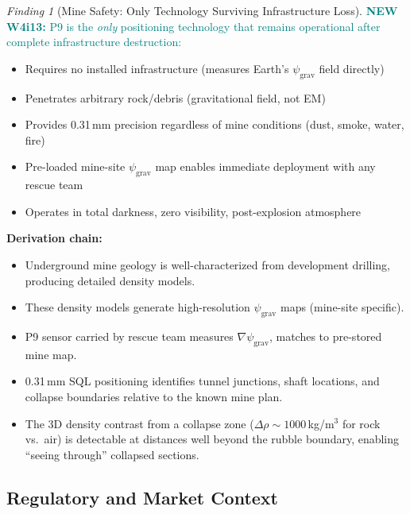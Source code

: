 \documentclass[11pt]{article}
\theoremstyle{definition}
\theoremstyle{remark}
\newtheorem{finding}[theorem]{Finding}
\newcommand{\psigrav}{\psi_{\mathrm{grav}}}
\newcommand{\drho}{\Delta\rho}
\newcommand{\newfinding}[1]{\textcolor{teal}{\textbf{NEW W4i13:} #1}}
\begin{document}
\begin{finding}[Mine Safety: Only Technology Surviving Infrastructure Loss]
\label{find:mine-safety}
\newfinding{P9 is the \emph{only} positioning technology that remains
operational after complete infrastructure destruction:}
\begin{itemize}[nosep]
\item Requires no installed infrastructure (measures Earth's $\psigrav$
  field directly)
\item Penetrates arbitrary rock/debris (gravitational field, not EM)
\item Provides 0.31\,mm precision regardless of mine conditions
  (dust, smoke, water, fire)
\item Pre-loaded mine-site $\psigrav$ map enables immediate deployment
  with any rescue team
\item Operates in total darkness, zero visibility, post-explosion
  atmosphere
\end{itemize}

\textbf{Derivation chain:}
\begin{itemize}[nosep]
\item Underground mine geology is well-characterized from development
  drilling, producing detailed density models.
\item These density models generate high-resolution $\psigrav$ maps
  (mine-site specific).
\item P9 sensor carried by rescue team measures $\nabla\psigrav$,
  matches to pre-stored mine map.
\item 0.31\,mm SQL positioning identifies tunnel junctions, shaft
  locations, and collapse boundaries relative to the known mine plan.
\item The 3D density contrast from a collapse zone ($\drho \sim
  1000$\,kg/m$^3$ for rock vs.\ air) is detectable at distances
  well beyond the rubble boundary, enabling ``seeing through''
  collapsed sections.
\end{itemize}
\end{finding}

\subsection{Regulatory and Market Context}
\end{document}
